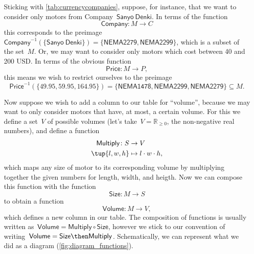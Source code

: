 Sticking with \cref{tab:currencycompanies}, suppose, for instance, that we want to consider only motors from Company~$\mathsf{Sanyo \ Denki}$. In terms of the function
\begin{equation*}
\mathsf{Company}\colon M \to C
\end{equation*}
this corresponds to the preimage~$\mathsf{Company}^{-1}(\{ \mathsf{Sanyo \ Denki} \}) = \{ \mathsf{NEMA2279}, \mathsf{NEMA2299}\}$, which is a subset of the set~$M$. Or, we may want to consider only motors which cost between 40 and 200 USD. In terms of the obvious function
\begin{equation*}
\mathsf{Price}\colon M \to P,
\end{equation*}
this means we wish to restrict ourselves to the preimage
\begin{equation*}
\mathsf{Price}^{-1}(\{ 49.95, 59.95, 164.95\}) = \{ \mathsf{NEMA1478}, \mathsf{NEMA2299}, \mathsf{NEMA2279} \} \subseteq M.
\end{equation*}

Now suppose we wish to add a column to our table for ``volume'', because we may want to only consider motors that have, at most, a certain volume. For this we define a set~$V$ of possible volumes (let's take~$V = \mathbb{R}_{\geq 0}$, the non-negative real numbers), and define a function
\begin{equation*}
\begin{aligned}
\mathsf{Multiply}\colon S &\to V\\
\tup{l, w, h} &\mapsto l \cdot w \cdot h,
\end{aligned}
\end{equation*}
which maps any size of motor to its corresponding volume by multiplying together the given numbers for length, width, and heigth.  Now we can compose this function with the function
\begin{equation*}
\mathsf{Size}\colon M \to S
\end{equation*}
to obtain a function
\begin{equation*}
\mathsf{Volume}\colon M \to V,
\end{equation*}
which defines a new column in our table. The composition of functions is usually written as~$\mathsf{Volume} = \mathsf{Multiply} \circ \mathsf{Size}$, however we stick to our convention of writing~$\mathsf{Volume} = \mathsf{Size} \then \mathsf{Multiply}$. Schematically, we can represent what we did as a diagram (\cref{fig:diagram_functions}).




